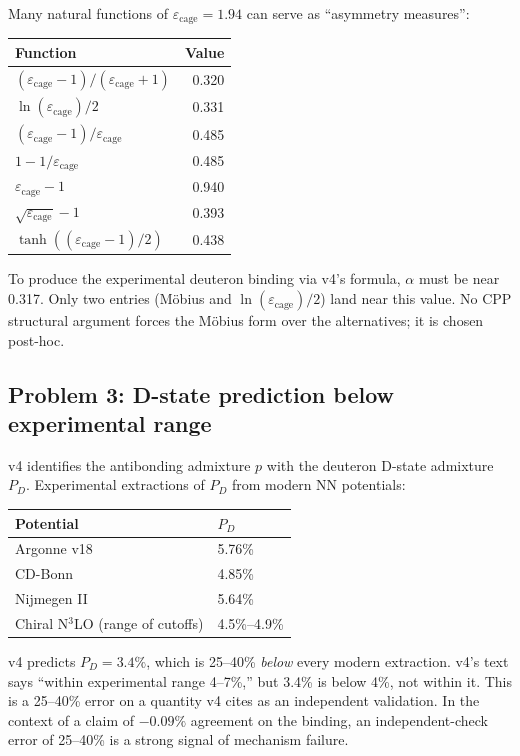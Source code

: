 \documentclass[11pt,letterpaper]{article}
\newcommand{\epscage}{\varepsilon_{\mathrm{cage}}}
\begin{document}
Many natural functions of $\epscage = 1.94$ can serve as ``asymmetry measures'':
\begin{center}
\begin{tabular}{lr}
\toprule
Function & Value \\
\midrule
$(\epscage - 1)/(\epscage + 1)$ & 0.320 \\
$\ln(\epscage)/2$ & 0.331 \\
$(\epscage - 1)/\epscage$ & 0.485 \\
$1 - 1/\epscage$ & 0.485 \\
$\epscage - 1$ & 0.940 \\
$\sqrt{\epscage} - 1$ & 0.393 \\
$\tanh((\epscage-1)/2)$ & 0.438 \\
\bottomrule
\end{tabular}
\end{center}
To produce the experimental deuteron binding via v4's formula, $\alpha$ must be near 0.317. Only two entries (Möbius and $\ln(\epscage)/2$) land near this value. No CPP structural argument forces the Möbius form over the alternatives; it is chosen post-hoc.

\subsection{Problem 3: D-state prediction below experimental range}

v4 identifies the antibonding admixture $p$ with the deuteron D-state admixture $P_D$. Experimental extractions of $P_D$ from modern NN potentials:
\begin{center}
\begin{tabular}{ll}
\toprule
Potential & $P_D$ \\
\midrule
Argonne v18 & 5.76\% \\
CD-Bonn & 4.85\% \\
Nijmegen II & 5.64\% \\
Chiral N$^3$LO (range of cutoffs) & 4.5\%--4.9\% \\
\bottomrule
\end{tabular}
\end{center}
v4 predicts $P_D = 3.4\%$, which is 25--40\% \emph{below} every modern extraction. v4's text says ``within experimental range 4--7\%,'' but 3.4\% is below 4\%, not within it. This is a 25--40\% error on a quantity v4 cites as an independent validation. In the context of a claim of $-0.09\%$ agreement on the binding, an independent-check error of 25--40\% is a strong signal of mechanism failure.
\end{document}
